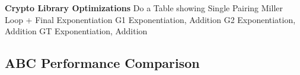 \textbf{Crypto Library Optimizations}
Do a Table showing 
Single Pairing
Miller Loop + Final Exponentiation
G1 Exponentiation, Addition
G2 Exponentiation, Addition
GT Exponentiation, Addition












































\subsection{ABC Performance Comparison}


